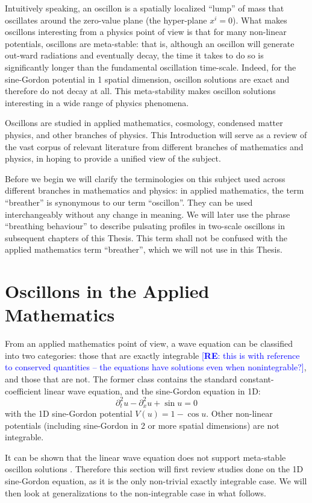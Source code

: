 \documentclass{report}
\newcommand{\re}[1]{\textcolor{blue}{[{\bf RE}: #1]}}
\begin{document}
Intuitively speaking, an oscillon is a spatially localized ``lump'' of mass that oscillates around the zero-value plane (the hyper-plane $x^i=0$). What makes oscillons interesting from a physics point of view is that for many non-linear potentials, oscillons are meta-stable: that is, although an oscillon will generate out-ward radiations and eventually decay, the time it takes to do so is significantly longer than the fundamental oscillation time-scale. Indeed, for the sine-Gordon potential in 1 spatial dimension, oscillon solutions are exact and therefore do not decay at all. This meta-stability makes oscillon solutions interesting in a wide range of physics phenomena.

Oscillons are studied in applied mathematics, cosmology, condensed matter physics, and other branches of physics. This Introduction will serve as a review of the vast corpus of relevant literature from different branches of mathematics and physics, in hoping to provide a unified view of the subject.

Before we begin we will clarify the terminologies on this subject used across different branches in mathematics and physics: in applied mathematics, the term ``breather'' is synonymous to our term ``oscillon''. They can be used interchangeably without any change in meaning. We will later use the phrase ``breathing behaviour'' to describe pulsating profiles in two-scale oscillons in subsequent chapters of this Thesis. This term shall not be confused with the applied mathematics term ``breather'', which we will not use in this Thesis.

\section{Oscillons in the Applied Mathematics}
From an applied mathematics point of view, a wave equation can be classified into two categories: those that are exactly integrable \re{this is with reference to conserved quantities -- the equations have solutions even when nonintegrable?}, and those that are not. The former class contains the standard constant-coefficient linear wave equation, and the sine-Gordon equation in 1D:
\begin{equation}
  \partial^2_t u - \partial^2_x u + \sin u = 0
\end{equation}
with the 1D sine-Gordon potential $V(u) = 1-\cos u$. Other non-linear potentials (including sine-Gordon in 2 or more spatial dimensions) are not integrable.

It can be shown that the linear wave equation does not support meta-stable oscillon solutions \cite{Copeland:1995fq}. Therefore this section will first review studies done on the 1D sine-Gordon equation, as it is the only non-trivial exactly integrable case. We will then look at generalizations to the non-integrable case in what follows.
\end{document}
